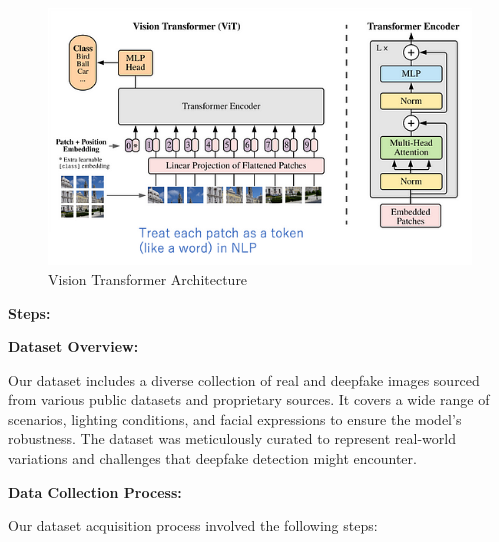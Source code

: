 \begin{figure}[h]
    \centering
    \includegraphics[width=6in]{img/visiontransformer.png}
    \caption{Vision Transformer Architecture}
\end{figure}

\newpage
\noindent \textbf{Steps:}
\vspace{0.2cm}

\noindent \textbf{Dataset Overview:}

\noindent Our dataset includes a diverse collection of real and deepfake images sourced from various public datasets and proprietary sources. It covers a wide range of scenarios, lighting conditions, and facial expressions to ensure the model's robustness. The dataset was meticulously curated to represent real-world variations and challenges that deepfake detection might encounter.

\noindent \textbf{Data Collection Process:}

\noindent Our dataset acquisition process involved the following steps:

